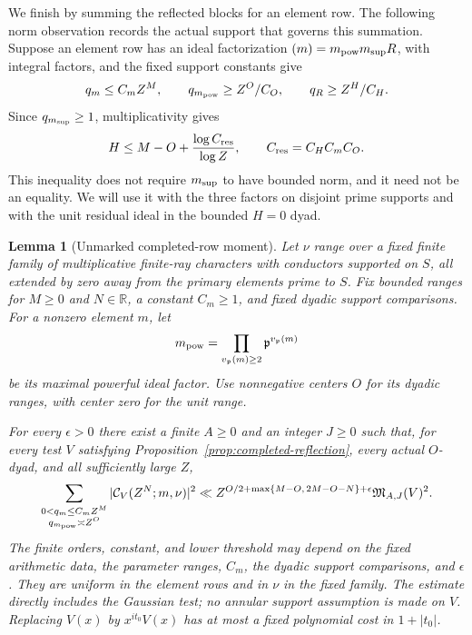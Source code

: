 \documentclass[11pt,a4paper]{article}
\numberwithin{equation}{section}
\numberwithin{figure}{section}
\newtheorem{lemma}[theorem]{Lemma}
\theoremstyle{definition}
\theoremstyle{remark}
\begin{document}
We finish by summing the reflected blocks for an element row.  The following
norm observation records the actual support that governs this summation.
Suppose an element row has an ideal factorization
$(m)=m_{\rm pow}m_{\rm sup}R$, with integral factors, and the fixed support
constants give
\[
 q_m\le C_mZ^M,\qquad q_{m_{\rm pow}}\ge Z^O/C_O,
 \qquad q_R\ge Z^H/C_H.
\]
Since $q_{m_{\rm sup}}\ge1$, multiplicativity gives
\begin{equation}\label{eq:actual-residual-row-dyad}
 H\le M-O+\frac{\log C_{\rm res}}{\log Z},
 \qquad C_{\rm res}=C_HC_mC_O.
\end{equation}
This inequality does not require $m_{\rm sup}$ to have bounded norm, and it
need not be an equality.  We will use it with the three factors on disjoint
prime supports and with the unit residual ideal in the bounded $H=0$ dyad.

\begin{lemma}[Unmarked completed-row moment]
\label{lem:unmarked-completed-moment}
Let $\nu$ range over a fixed finite family of multiplicative finite-ray
characters with conductors supported on $S$, all extended by zero away from
the primary elements prime to $S$.  Fix bounded ranges for $M\ge0$ and $N\in\mathbb R$,
a constant $C_m\ge1$, and fixed dyadic support comparisons.  For a nonzero
element $m$, let
\[
 m_{\rm pow}=\prod_{v_{\mathfrak p}(m)\ge2}
                 \mathfrak p^{v_{\mathfrak p}(m)}
\]
be its maximal powerful ideal factor.  Use nonnegative centers $O$ for its
dyadic ranges, with center zero for the unit range.

For every $\epsilon>0$ there exist a finite $A\ge0$ and an integer $J\ge0$
such that, for every test $V$ satisfying
Proposition~\ref{prop:completed-reflection}, every actual $O$-dyad, and all
sufficiently large $Z$,
\begin{equation}\label{eq:unmarked-completed-moment}
 \sum_{\substack{0<q_m\le C_mZ^M\\q_{m_{\rm pow}}\asymp Z^O}}
       |\mathcal C_V(Z^N;m,\nu)|^2
 \ll Z^{O/2+\max\{M-O,\,2M-O-N\}+\epsilon}
       \mathfrak M_{A,J}(V)^2.
\end{equation}
The finite orders, constant, and lower threshold may depend on the fixed
arithmetic data, the parameter ranges, $C_m$, the dyadic support comparisons,
and $\epsilon$.  They are uniform in the element rows and in $\nu$ in the
fixed family.  The estimate directly includes the Gaussian test; no annular
support assumption is made on $V$.  Replacing $V(x)$ by $x^{it_0}V(x)$ has
at most a fixed polynomial cost in $1+|t_0|$.
\end{lemma}
\end{document}
